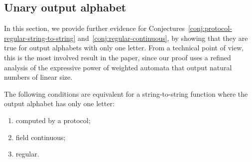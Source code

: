 \subsection{Unary output alphabet}
\label{sec:unary-output-alphabet}
In this section, we provide further evidence for Conjectures~\ref{conj:protocol-regular-string-to-string} and~\ref{conj:regular-continuous}, by showing that they are true for output alphabets with only one letter. From a technical point of view, this is the most involved result in the paper, since our proof uses a refined analysis of the expressive power of weighted automata that output natural numbers of linear size.

\begin{theorem}\label{thm:unary-string-to-string}
    The following conditions are equivalent for  a string-to-string function where  the output alphabet  has only one letter:
    \begin{enumerate}
        \item computed by a protocol;
        \item \label{it:unary-weighted-continuous} field continuous;
        \item \label{it:unary-regular} regular.
    \end{enumerate}
\end{theorem}
